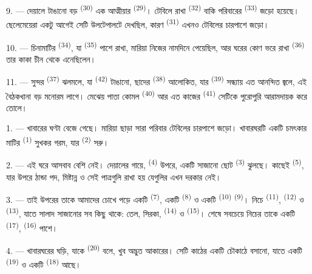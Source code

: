9. --- দেয়ালে টাঙানো বড়  \textsuperscript{(30)} এক আত্মীয়ার
 \textsuperscript{(29)}। টেবিলে রাখা 
\textsuperscript{(32)} বাকি পরিবারের  \textsuperscript{(33)} জড়ো
হয়েছে। ছেলেমেয়েরা একটু আগেই সেটি উলটেপালটে দেখছিল, কারণ 
\textsuperscript{(31)} এখনও টেবিলের চারপাশে জড়ো।

10. --- চিনামাটির  \textsuperscript{(34)}, যা
 \textsuperscript{(35)} পাশে রাখা, মারিয়া নিজের
নামদিনে পেয়েছিল, আর ঘরের কোণ ভরে রাখা 
\textsuperscript{(36)} তার কাকা চীন থেকে এনেছিলেন।

11. --- সুন্দর  \textsuperscript{(37)} ঝলমলে, যা 
\textsuperscript{(42)} টাঙানো, ছাদের  \textsuperscript{(38)}
আলোকিত, যার  \textsuperscript{(39)} সন্ধ্যায় এত আনন্দিত
জ্বলে, এই বৈঠকখানা বড় মনোরম লাগে। মেঝেয় পাতা কোমল 
\textsuperscript{(40)} আর এত কাজের  \textsuperscript{(41)}
সেটিকে পুরোপুরি আরামদায়ক করে তোলে।

\VUsaut{3.6mm}
\VUsaut{3.0mm}

1. --- খাবারের ঘণ্টা বেজে গেছে। মারিয়া ছাড়া সারা পরিবার টেবিলের চারপাশে
জড়ো। খাবারঘরটি একটি চমৎকার মাটির  \textsuperscript{(1)} সুখকর
গরম, যার  \textsuperscript{(2)} সরু।

2. --- এই ঘরে আসবাব বেশি নেই। দেয়ালের গায়ে, 
\textsuperscript{(4)} উপরে, একটি সাজানো ছোট  \textsuperscript{(3)}
ঝুলছে। কাছেই  \textsuperscript{(5)}, যার উপরে ঠান্ডা
পদ, মিষ্টান্ন ও সেই পাত্রগুলি রাখা হয় যেগুলির এখন দরকার নেই।

3. --- তাই উপরের তাকে আমাদের চোখে পড়ে একটি 
\textsuperscript{(7)}, একটি  \textsuperscript{(8)} ও একটি
 \textsuperscript{(10)}  \textsuperscript{(9)}। নিচে
 \textsuperscript{(11)},  \textsuperscript{(12)} ও
 \textsuperscript{(13)}, যাতে সালাদ সাজানোর সব কিছু
থাকে: তেল, সিরকা,  \textsuperscript{(14)} ও 
\textsuperscript{(15)}। শেষে সবচেয়ে নিচের তাকে একটি 
\textsuperscript{(17)},  \textsuperscript{(16)} পাশে।

4. --- খাবারঘরের ঘড়ি, যাকে  \textsuperscript{(20)} বলে, খুব
অদ্ভুত আকারের। সেটি কাঠের একটি চৌকাঠে বসানো, যাতে একটি 
\textsuperscript{(19)} ও একটি  \textsuperscript{(18)} আছে।

